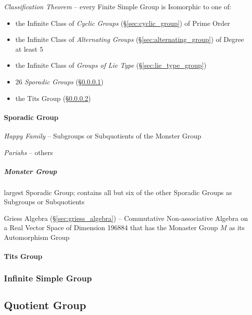 \emph{Classification Theorem} -- every Finite Simple Group is Isomorphic to one
of:
\begin{itemize}
  \item the Infinite Class of \emph{Cyclic Groups} (\S\ref{sec:cyclic_group}) of
    Prime Order
  \item the Infinite Class of \emph{Alternating Groups}
    (\S\ref{sec:alternating_group}) of Degree at least $5$
  \item the Infinite Class of \emph{Groups of Lie Type}
    (\S\ref{sec:lie_type_group})
  \item 26 \emph{Sporadic Groups} (\S\ref{sec:sporadic_group})
  \item the Tits Group (\S\ref{sec:tits_group})
\end{itemize}



\paragraph{Sporadic Group}\label{sec:sporadic_group}\hfill

\emph{Happy Family} -- Subgroups or Subquotients of the Monster Group

\emph{Pariahs} -- others



\subparagraph{Monster Group}\label{sec:monster_group}\hfill

largest Sporadic Group; contains all but six of the other Sporadic Groups as
Subgroups or Subquotients

Griess Algebra (\S\ref{sec:griess_algebra}) -- Commutative Non-associative
Algebra on a Real Vector Space of Dimension 196884 that has the Monaster Group
$M$ as its Automorphism Group



\paragraph{Tits Group}\label{sec:tits_group}\hfill



\subsubsection{Infinite Simple Group}\label{sec:infinite_simple_group}



\subsection{Quotient Group}\label{sec:quotient_group}

